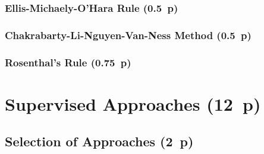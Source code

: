 
\subsubsection{Ellis-Michaely-O'Hara
  Rule (0.5~p)}\label{ellis-michaely-ohara-rule}

\begin{algorithm}


  \caption{$\operatorname{\mathtt{emo}}$ \label{alg:emo-rule}}


  \BlankLine %

\end{algorithm}

\subsubsection{Chakrabarty-Li-Nguyen-Van-Ness
  Method (0.5~p)}\label{chakarabarty-li-nguyen-van-ness-method}


\subsubsection{Rosenthal's Rule (0.75~p)}\label{rosenthals-rule}

\newpage
\section{Supervised Approaches (12~p)}\label{supervised-approaches}

\subsection{Selection of Approaches (2~p)}\label{selection-of-approaches}

